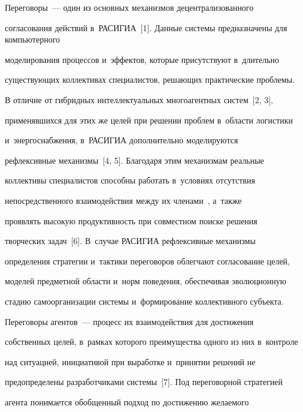 \vspace*{-4pt}








  Переговоры~--- один из основных механизмов децентрализованного 


согласования действий в~\mbox{РАСИГИА}~[1]. Данные сис\-те\-мы предназначены для компьютерного 


моделирования процессов и~эффектов, которые присутствуют в~длительно 


существующих коллективах специалистов, ре\-ша\-ющих практические проб\-ле\-мы. 


В отличие от гибридных интеллектуальных многоагентных сис\-тем~[2, 3], 


применявшихся для этих же целей при решении проб\-лем в~об\-ласти логистики 


и~энергоснабжения, в~\mbox{РАСИГИА} дополнительно моделируются 


рефлексивные механизмы~[4, 5]. Благодаря этим механизмам реальные 


коллективы специалистов способны работать в~условиях отсутствия 


непосредственного взаимодействия между их членами~\cite{4-lis}, а~также 


проявлять высокую про\-дук\-тив\-ность при совместном поиске решения 


творческих задач~[6]. В~случае \mbox{РАСИГИА} рефлексивные механизмы 


определения стратегии и~тактики переговоров облегчают согласование целей, 


моделей предметной области и~норм поведения, обеспечивая эволюционную 


стадию самоорганизации сис\-те\-мы и~формирование коллективного субъ\-екта.





  


  Переговоры агентов~--- процесс их взаимодействия для достижения 


собственных целей, в~рамках которого преимущества одного из них в~контроле 


над ситуацией, инициативой при выработке и~принятии решений не 


пред\-опре\-де\-ле\-ны разработчиками системы~[7]. Под переговорной стратегией 


агента понимается обобщенный подход по достижению желаемого 


